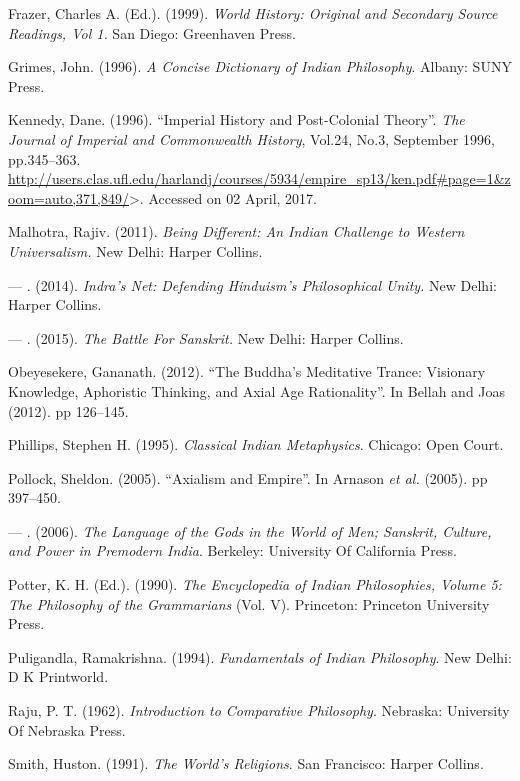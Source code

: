 \begin{thebibliography}{99}
  Frazer, Charles A. (Ed.). (1999). \textit{World History: Original and Secondary Source Readings, Vol 1.} San Diego: Greenhaven Press.

  Grimes, John. (1996). \textit{A Concise Dictionary of Indian Philosophy}. Albany: SUNY Press.

  Kennedy, Dane. (1996). “Imperial History and Post-Colonial Theory”. \textit{The Journal of Imperial and Commonwealth History}, Vol.24, No.3, September 1996, pp.345--363. \url{http://users.clas.ufl.edu/harlandj/courses/5934/empire_sp13/ken.pdf#page=1&zoom=auto,371,849/}\textgreater . Accessed on 02 April, 2017.

  Malhotra, Rajiv. (2011). \textit{Being Different: An Indian Challenge to Western Universalism.} New Delhi: Harper Collins.

  — . (2014).\textit{ Indra's Net: Defending Hinduism's Philosophical Unity.} New Delhi: Harper Collins.

  — . (2015). \textit{The Battle For Sanskrit.} New Delhi: Harper Collins.

  Obeyesekere, Gananath. (2012). “The Buddha’s Meditative Trance: Visionary Knowledge, Aphoristic Thinking, and Axial Age Rationality”. In Bellah and Joas (2012). pp 126--145.

  Phillips, Stephen H. (1995). \textit{Classical Indian Metaphysics}. Chicago: Open Court.

  Pollock, Sheldon. (2005). “Axialism and Empire”. In Arnason \textit{et al.} (2005). pp 397--450.

  — . (2006). \textit{The Language of the Gods in the World of Men; Sanskrit, Culture, and Power in Premodern India}. Berkeley: University Of California Press.

  Potter, K. H. (Ed.). (1990). \textit{The Encyclopedia of Indian Philosophies, Volume 5: The Philosophy of the Grammarians} (Vol. V). Princeton: Princeton University Press.

  Puligandla, Ramakrishna. (1994). \textit{Fundamentals of Indian Philosophy}. New Delhi: D K Printworld.

  Raju, P. T. (1962). \textit{Introduction to Comparative Philosophy}. Nebraska: University Of Nebraska Press.

  Smith, Huston. (1991). \textit{The World’s Religions}. San Francisco: Harper Collins.


\end{thebibliography}
